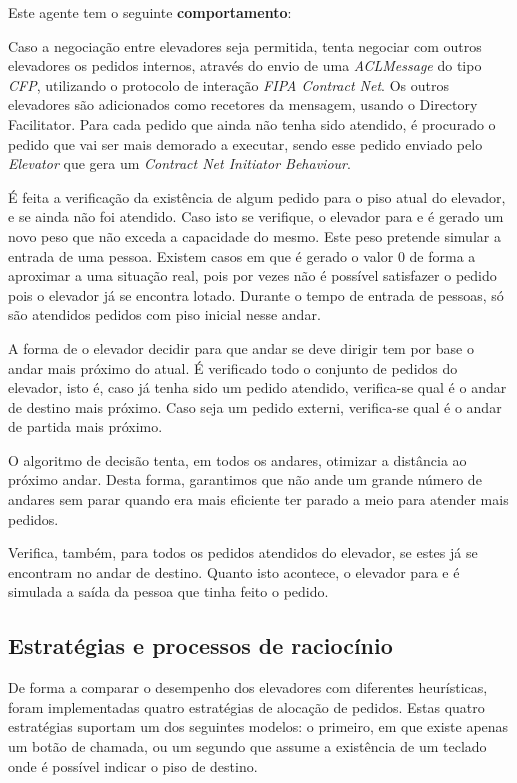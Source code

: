 ﻿\documentclass[a4paper]{article}
\begin{document}
Este agente tem o seguinte \textbf{comportamento}:

Caso a negociação entre elevadores seja permitida, tenta negociar com outros elevadores os pedidos internos, através do envio de uma \textit{ACLMessage} do tipo \textit{CFP}, utilizando o protocolo de interação \textit{FIPA Contract Net}. Os outros elevadores são adicionados como recetores da mensagem, usando o Directory Facilitator. Para cada pedido que ainda não tenha sido atendido, é procurado o pedido que vai ser mais demorado a executar, sendo esse pedido enviado pelo \textit{Elevator} que gera um \textit{Contract Net Initiator Behaviour}.

É feita a verificação da existência de algum pedido para o piso atual do elevador, e se ainda não foi atendido. Caso isto se verifique, o elevador para e é gerado um novo peso que não exceda a capacidade do mesmo. Este peso pretende simular a entrada de uma pessoa. Existem casos em que é gerado o valor 0 de forma a aproximar a uma situação real, pois por vezes não é possível satisfazer o pedido pois o elevador já se encontra lotado. Durante o tempo de entrada de pessoas, só são atendidos pedidos com piso inicial nesse andar.

A forma de o elevador decidir para que andar se deve dirigir tem por base o andar mais próximo do atual. É verificado todo o conjunto de pedidos do elevador, isto é, caso já tenha sido um pedido atendido, verifica-se qual é o andar de destino mais próximo. Caso seja um pedido externi, verifica-se qual é o andar de partida mais próximo.

O algoritmo de decisão tenta, em todos os andares, otimizar a distância ao próximo andar. Desta forma, garantimos que não ande um grande número de andares sem parar quando era mais eficiente ter parado a meio para atender mais pedidos.

Verifica, também, para todos os pedidos atendidos do elevador, se estes já se encontram no andar de destino. Quanto isto acontece, o elevador para e é simulada a saída da pessoa que tinha feito o pedido.

\subsection{Estratégias e processos de raciocínio} 

De forma a comparar o desempenho dos elevadores com diferentes heurísticas, foram implementadas quatro estratégias de alocação de pedidos. Estas quatro estratégias suportam um dos seguintes modelos: o primeiro, em que existe apenas um botão de chamada, ou um segundo que assume a existência de um teclado onde é possível indicar o piso de destino.
\end{document}

